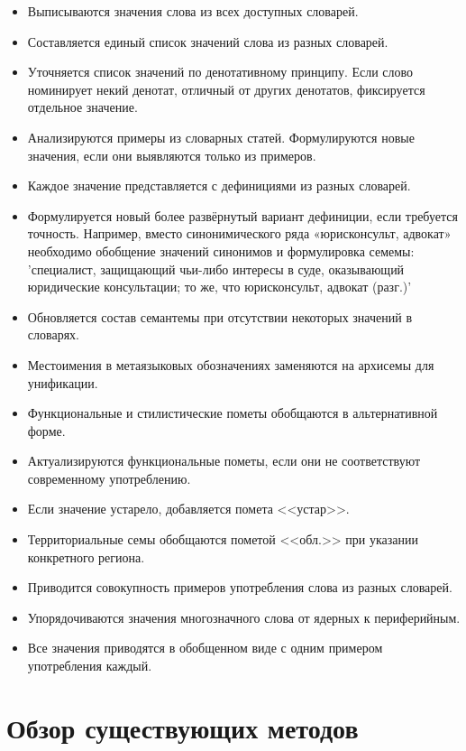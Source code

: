 \documentclass[LI,VKR]{HSEUniversity}
\begin{document}
\begin{itemize}
    \item Выписываются значения слова из всех доступных словарей.
    \item Составляется единый список значений слова из разных словарей.
    \item Уточняется список значений по денотативному принципу.
Если слово номинирует
некий денотат, отличный от других денотатов, фиксируется отдельное
значение.
    \item Анализируются примеры из словарных статей.
Формулируются новые значения, если они выявляются только из примеров.
    \item Каждое значение представляется с дефинициями из разных словарей.
    \item Формулируется новый более развёрнутый вариант дефиниции, если требуется точность.
Например, вместо синонимического ряда «юрисконсульт, адвокат»
необходимо обобщение значений синонимов и формулировка семемы:
’специалист, защищающий чьи-либо интересы в суде, оказывающий
юридические консультации; то же, что юрисконсульт, адвокат (разг.)’
    \item Обновляется состав семантемы при отсутствии некоторых значений в словарях.
    \item Местоимения в метаязыковых обозначениях заменяются на архисемы для унификации.
    \item Функциональные и стилистические пометы обобщаются в альтернативной форме.
    \item Актуализируются функциональные пометы, если они не соответствуют современному употреблению.
    \item Если значение устарело, добавляется помета <<устар>>.
    \item Территориальные семы обобщаются пометой <<обл.>> при указании конкретного региона.
    \item Приводится совокупность примеров употребления слова из разных словарей.
    \item Упорядочиваются значения многозначного слова от ядерных к периферийным.
    \item Все значения приводятся в обобщенном виде с одним примером употребления каждый.
\end{itemize}

\section{Обзор существующих методов}
\end{document}
